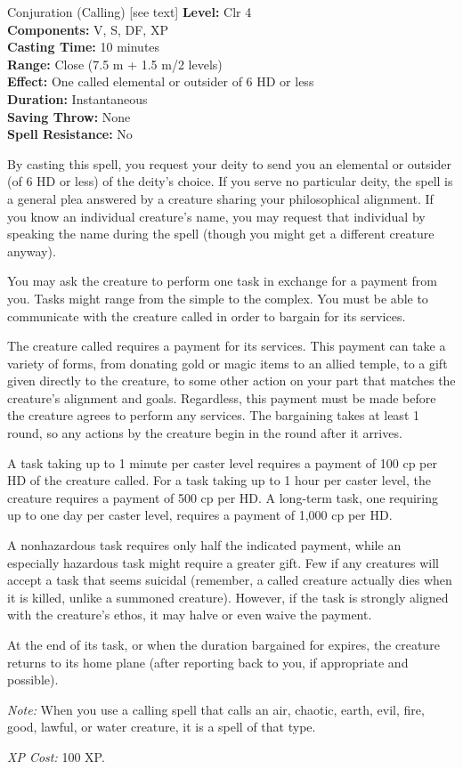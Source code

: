 {Conjuration (Calling) [see text]}
{
	\textbf{Level:}
	Clr 4\\
	\textbf{Components:}
	V, S, DF, XP\\
	\textbf{Casting Time:}
	10 minutes\\
	\textbf{Range:}
	Close (7.5 m + 1.5 m/2 levels)\\
	\textbf{Effect:}
	One called elemental or outsider of 6 HD or less\\
	\textbf{Duration:}
	Instantaneous\\
	\textbf{Saving Throw:}
	None\\
	\textbf{Spell Resistance:}
	No\\
}
{
	By casting this spell, you request your deity to send you an elemental or outsider (of 6 HD or less) of the deity's choice. If you serve no particular deity, the spell is a general plea answered by a creature sharing your philosophical alignment. If you know an individual creature's name, you may request that individual by speaking the name during the spell (though you might get a different creature anyway).

	You may ask the creature to perform one task in exchange for a payment from you. Tasks might range from the simple to the complex. You must be able to communicate with the creature called in order to bargain for its services.

	The creature called requires a payment for its services. This payment can take a variety of forms, from donating gold or magic items to an allied temple, to a gift given directly to the creature, to some other action on your part that matches the creature's alignment and goals. Regardless, this payment must be made before the creature agrees to perform any services. The bargaining takes at least 1 round, so any actions by the creature begin in the round after it arrives.

	A task taking up to 1 minute per caster level requires a payment of 100 cp per HD of the creature called. For a task taking up to 1 hour per caster level, the creature requires a payment of 500 cp per HD. A long-term task, one requiring up to one day per caster level, requires a payment of 1,000 cp per HD.

	A nonhazardous task requires only half the indicated payment, while an especially hazardous task might require a greater gift. Few if any creatures will accept a task that seems suicidal (remember, a called creature actually dies when it is killed, unlike a summoned creature). However, if the task is strongly aligned with the creature's ethos, it may halve or even waive the payment.

	At the end of its task, or when the duration bargained for expires, the creature returns to its home plane (after reporting back to you, if appropriate and possible).

	\textit{Note:} When you use a calling spell that calls an air, chaotic, earth, evil, fire, good, lawful, or water creature, it is a spell of that type.

	\textit{XP Cost:}
	100 XP.

}
